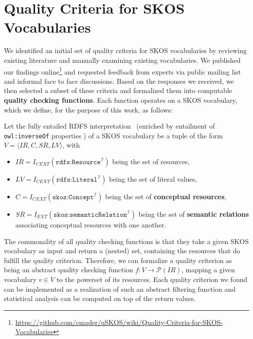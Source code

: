 
\section{Quality Criteria for SKOS Vocabularies}\label{sec:criteria}


We identified an initial set of quality criteria for SKOS vocabularies by reviewing existing literature and manually examining existing vocabularies. We published our findings online\footnote{\url{https://github.com/cmader/qSKOS/wiki/Quality-Criteria-for-SKOS-Vocabularies}} and requested feedback from experts via public mailing list and informal face to face discussions. Based on the responses we received, we then selected a subset of these criteria and formalized them into computable \textbf{quality checking functions}. Each function operates on a SKOS vocabulary, which we define, for the purpose of this work, as follows:

\begin{definition} Let the fully entailed RDFS interpretation~\cite{RDFSEM2012} (enriched by entailment of \texttt{owl:inverseOf} properties ) of a SKOS vocabulary be a tuple of the form $V = \langle IR, C, SR, LV \rangle$, with
    
\begin{itemize}
	\item \(IR = I_{CEXT}(\texttt{rdfs:Resource}^\mathcal{I})\) being the set of resources,

	\item $LV = I_{CEXT}(\texttt{rdfs:Literal}^\mathcal{I})$ being the set of literal values,

	\item \(C = I_{CEXT}(\texttt{skos:Concept}^\mathcal{I})\) being the set of \textbf{conceptual resources},

	\item \(SR = I_{EXT}(\texttt{skos:semanticRelation}^\mathcal{I})\) being the set of \textbf{semantic relations} associating conceptual resources with one another.

\end{itemize}

\end{definition}

The commonality of all quality checking functions is that they take a given SKOS vocabulary as input and return a (nested) set, containing the resources that do  fulfill the quality criterion. Therefore, we can formalize a quality criterion as being an abstract quality checking function $f:V \rightarrow \mathcal{P}(IR)$, mapping a given vocabulary $v \in V$ to the powerset of its resources. Each quality criterion we found can be implemented as a realization of such an abstract filtering function and statistical analysis can be computed on top of the return values.

